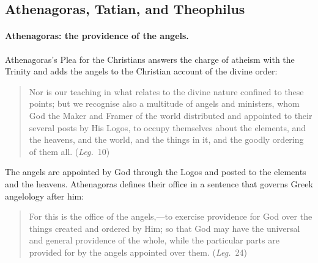 \sectionguard
\subsection{Athenagoras, Tatian, and Theophilus}\label{sec:fb-athenagoras}

\paragraph{Athenagoras: the providence of the angels.} Athenagoras's Plea
for the Christians answers the charge of atheism with the Trinity and adds
the angels to the Christian account of the divine order:

\begin{quote}
Nor is our teaching in what relates to the divine nature confined to these
points; but we recognise also a multitude of angels and ministers, whom
God the Maker and Framer of the world distributed and appointed to their
several posts by His Logos, to occupy themselves about the elements, and
the heavens, and the world, and the things in it, and the goodly ordering
of them all. (\emph{Leg.}\ 10)
\end{quote}

\noindent The angels are appointed by God through the Logos and posted to
the elements and the heavens. Athenagoras defines their office in a
sentence that governs Greek angelology after him:

\begin{quote}
For this is the office of the angels,---to exercise providence for God
over the things created and ordered by Him; so that God may have the
universal and general providence of the whole, while the particular parts
are provided for by the angels appointed over them. (\emph{Leg.}\ 24)
\end{quote}

